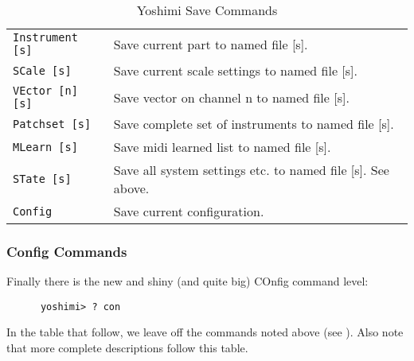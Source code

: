    \begin{table}[H]
      \centering
      \caption{Yoshimi Save Commands}
      \label{table:yoshimi_text_loadsave_commands}
      \begin{tabular}{l l}

\texttt{Instrument [s]} &
   Save current part to named file [s]. \\
\texttt{SCale [s]} &
   Save current scale settings to named file [s]. \\
\texttt{VEctor [n] [s]} &
   Save vector on channel n to named file [s]. \\
\texttt{Patchset [s]} &
   Save complete set of instruments to named file [s]. \\
\texttt{MLearn [s]} &
   Save midi learned list to named file [s]. \\
\texttt{STate [s]} &
   Save all system settings etc. to named file [s].  See above. \\
\texttt{Config} &
   Save current configuration. \\

      \end{tabular}
   \end{table}

\subsubsection{Config Commands}
\label{subsec:command_line_config_list}

   Finally there is the new and shiny (and quite big) COnfig command level:

   \begin{verbatim}
      yoshimi> ? con
   \end{verbatim}

   In the table that follow, we leave off the commands noted above
   (see ).  Also
   note that more complete descriptions follow this table.

